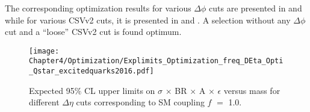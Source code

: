 The corresponding optimization results for various $\Delta\phi$ cuts are presented in \fig{\ref{fig:DPhiOpti}} and \tab{\ref{Table:DPhiOpti}} while for various CSVv2
cuts, it is presented in \fig{\ref{fig:BTagOpti}} and \tab{\ref{Table:BTagOpti}}. A selection without any $\Delta\phi$ cut and a ``loose'' CSVv2 cut is found optimum.

\vspace{-0.1in}
\begin{table}[htbp]
  \begin{minipage}{0.54\textwidth}
    \begin{figure}[H]
      \texttt{[image: Chapter4/Optimization/Explimits\_Optimization\_freq\_DEta\_Opti\_Qstar\_excitedquarks2016.pdf]}
      \caption{Expected 95$\%$ CL upper limits on $\sigma$ $\times$ BR $\times$ A $\times$ $\epsilon$ versus \qstar mass
        for different ${\Delta}{\eta}$ cuts corresponding to SM coupling $f$ $=$ 1.0.}
      \label{fig:DEtaOpti}
    \end{figure}
  \end{minipage}%
  \hfill
  \begin{minipage}{0.44\textwidth}
    \centering
    \caption{${\Delta}{\eta}$ cut optimization corresponding to different mass expected limits.}
    \label{Table:DEtaOpti}
  \end{minipage}
\end{table}
\vspace{-0.1in}

